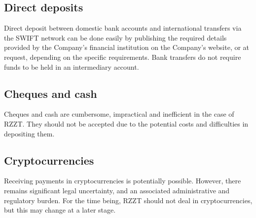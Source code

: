 \documentclass[a4paper,10pt]{article}
\begin{document}
\subsection{Direct deposits}

Direct deposit between domestic bank accounts and international transfers via the SWIFT network can be done easily by publishing the required details provided by the Company's financial institution on the Company's website, or at request, depending on the specific requirements. Bank transfers do not require funds to be held in an intermediary account.

\subsection{Cheques and cash}

Cheques and cash are cumbersome, impractical and inefficient in the case of RZZT. They should not be accepted due to the potential costs and difficulties in depositing them.

\subsection{Cryptocurrencies}

Receiving payments in cryptocurrencies is potentially possible. However, there remains significant legal uncertainty, and an associated administrative and regulatory burden. For the time being, RZZT should not deal in cryptocurrencies, but this may change at a later stage.
\end{document}

